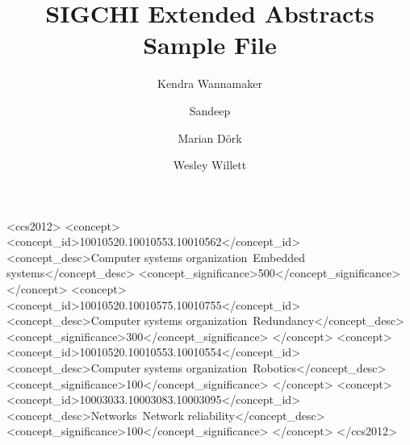 \documentclass[sigchi-a, authorversion]{acmart}
\begin{document}
\title{SIGCHI Extended Abstracts Sample File}

\author{Kendra Wannamaker}

\author{Sandeep}

\author{Marian Dörk}


\author{Wesley Willett}


\renewcommand{\shortauthors}{F. Author et al.}


%
%
\begin{CCSXML}
<ccs2012>
 <concept>
  <concept_id>10010520.10010553.10010562</concept_id>
  <concept_desc>Computer systems organization~Embedded systems</concept_desc>
  <concept_significance>500</concept_significance>
 </concept>
 <concept>
  <concept_id>10010520.10010575.10010755</concept_id>
  <concept_desc>Computer systems organization~Redundancy</concept_desc>
  <concept_significance>300</concept_significance>
 </concept>
 <concept>
  <concept_id>10010520.10010553.10010554</concept_id>
  <concept_desc>Computer systems organization~Robotics</concept_desc>
  <concept_significance>100</concept_significance>
 </concept>
 <concept>
  <concept_id>10003033.10003083.10003095</concept_id>
  <concept_desc>Networks~Network reliability</concept_desc>
  <concept_significance>100</concept_significance>
 </concept>
</ccs2012>
\end{CCSXML}

\end{document}
